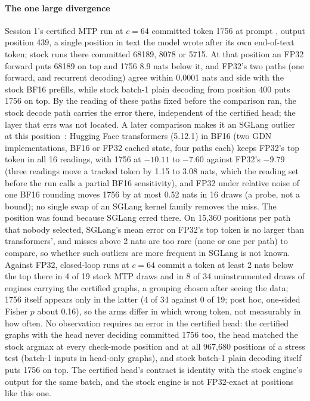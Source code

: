 \paragraph{The one large divergence} Session 1's certified MTP run at $c=64$ committed token 1756 at prompt , output position 439, a single position in text the model wrote after its own end-of-text token; stock runs there committed 68189, 8078 or 5715. At that position an FP32 forward puts 68189 on top and 1756 8.9 nats below it, and FP32's two paths (one forward, and recurrent decoding) agree within 0.0001 nats and side with the stock BF16 prefills, while stock batch-1 plain decoding from position 400 puts 1756 on top. By the reading of these paths fixed before the comparison ran, the stock decode path carries the error there, independent of the certified head; the layer that errs was not located. A later comparison makes it an SGLang outlier at this position~: Hugging Face transformers (5.12.1) in BF16 (two GDN implementations, BF16 or FP32 cached state, four paths each) keeps FP32's top token in all 16 readings, with 1756 at $-10.11$ to $-7.60$ against FP32's $-9.79$ (three readings move a tracked token by 1.15 to 3.08 nats, which the reading set before the run calls a partial BF16 sensitivity), and FP32 under relative noise of one BF16 rounding moves 1756 by at most 0.52 nats in 16 draws (a probe, not a bound); no single swap of an SGLang kernel family removes the miss. The position was found because SGLang erred there. On 15,360 positions per path that nobody selected, SGLang's mean error on FP32's top token is no larger than transformers', and misses above 2 nats are too rare (none or one per path) to compare, so whether such outliers are more frequent in SGLang is not known. Against FP32, closed-loop runs at $c=64$ commit a token at least 2 nats below the top there in 4 of 19 stock MTP draws and in 8 of 34 uninstrumented draws of engines carrying the certified graphs, a grouping chosen after seeing the data; 1756 itself appears only in the latter (4 of 34 against 0 of 19; post hoc, one-sided Fisher $p$ about 0.16), so the arms differ in which wrong token, not measurably in how often. No observation requires an error in the certified head: the certified graphs with the head never deciding committed 1756 too, the head matched the stock argmax at every check-mode position and at all 967,680 positions of a stress test (batch-1 inputs in head-only graphs), and stock batch-1 plain decoding itself puts 1756 on top. The certified head's contract is identity with the stock engine's output for the same batch, and the stock engine is not FP32-exact at positions like this one.
